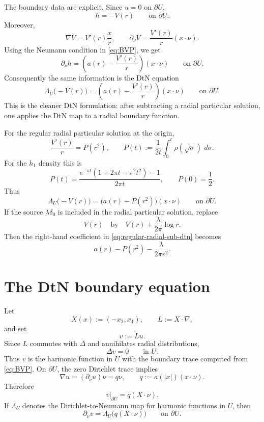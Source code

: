 \documentclass[11pt]{article}
\newcommand{\dd}{\,d}
\newcommand{\1}{\mathbf 1}
\begin{document}
The boundary data are explicit.  Since \(u=0\) on \(\partial U\),
\begin{equation}\label{eq:radial-sub-dirichlet}
  h=-V(r)
  \qquad\text{on }\partial U .
\end{equation}
Moreover,
\[
  \nabla V=V'(r)\frac{x}{r},
  \qquad
  \partial_\nu V=\frac{V'(r)}{r}(x\cdot\nu).
\]
Using the Neumann condition in \eqref{eq:BVP}, we get
\begin{equation}\label{eq:radial-sub-neumann}
  \partial_\nu h
  =
  \left(a(r)-\frac{V'(r)}{r}\right)(x\cdot\nu)
  \qquad\text{on }\partial U .
\end{equation}
Consequently the same information is the DtN equation
\begin{equation}\label{eq:radial-sub-dtn}
  \boxed{
  \Lambda_U\bigl(-V(r)\bigr)
  =
  \left(a(r)-\frac{V'(r)}{r}\right)(x\cdot\nu)
  \qquad\text{on }\partial U .
  }
\end{equation}
This is the cleaner DtN formulation: after subtracting a radial particular solution,
one applies the DtN map to a radial boundary function.

For the regular radial particular solution at the origin,
\[
  \frac{V'(r)}{r}
  =
  P(r^2),
  \qquad
  P(t):=\frac{1}{2t}\int_0^t\rho(\sqrt\sigma)\,\dd\sigma .
\]
For the \(h_1\) density this is
\begin{equation}\label{eq:P-explicit}
  P(t)
  =
  \frac{e^{-\pi t}(1+2\pi t-\pi^2t^2)-1}{2\pi t},
  \qquad
  P(0)=\frac12 .
\end{equation}
Thus
\begin{equation}\label{eq:regular-radial-sub-dtn}
  \boxed{
  \Lambda_U\bigl(-V(r)\bigr)
  =
  \bigl(a(r)-P(r^2)\bigr)(x\cdot\nu)
  \qquad\text{on }\partial U .
  }
\end{equation}
If the source \(\lambda\delta_0\) is included in the radial particular solution, replace
\[
  V(r)
  \quad\text{by}\quad
  V(r)+\frac{\lambda}{2\pi}\log r .
\]
Then the right-hand coefficient in \eqref{eq:regular-radial-sub-dtn} becomes
\[
  a(r)-P(r^2)-\frac{\lambda}{2\pi r^2}.
\]

\section{The DtN boundary equation}

Let
\[
  X(x):=(-x_2,x_1),\qquad L:=X\cdot\nabla ,
\]
and set
\[
  v:=Lu .
\]
Since \(L\) commutes with \(\Delta\) and annihilates radial distributions,
\[
  \Delta v=0
  \qquad\text{in }U .
\]
Thus \(v\) is the harmonic function in \(U\) with the boundary trace computed from
\eqref{eq:BVP}.  On \(\partial U\), the zero Dirichlet trace implies
\[
  \nabla u=(\partial_\nu u)\nu=q\nu,
  \qquad
  q:=a(|x|)(x\cdot\nu).
\]
Therefore
\begin{equation}\label{eq:v-boundary-trace}
  v|_{\partial U}
  =
  q(X\cdot\nu).
\end{equation}
If \(\Lambda_U\) denotes the Dirichlet-to-Neumann map for harmonic functions in \(U\),
then
\begin{equation}\label{eq:dtn-side}
  \partial_\nu v
  =
  \Lambda_U\bigl(q(X\cdot\nu)\bigr)
  \qquad\text{on }\partial U .
\end{equation}
\end{document}
